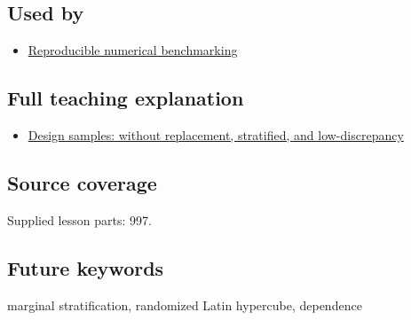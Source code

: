 \subsection{Used by}\label{appendix-1c5e85693a06-used-by}

\begin{itemize}
\tightlist
\item
  \hyperref[appendix-b9db93e28371]{Reproducible numerical benchmarking}
\end{itemize}

\subsection{Full teaching explanation}\label{appendix-1c5e85693a06-full-teaching-explanation}

\begin{itemize}
\tightlist
\item
  \hyperref[02-foundations-ii-ch031-design-samples-without-replacement-stratified-and-low-discrepancy]{Design samples: without replacement, stratified, and low-discrepancy}
\end{itemize}

\subsection{Source coverage}\label{appendix-1c5e85693a06-source-coverage}

Supplied lesson parts: 997.

\subsection{Future keywords}\label{appendix-1c5e85693a06-future-keywords}

marginal stratification, randomized Latin hypercube, dependence

